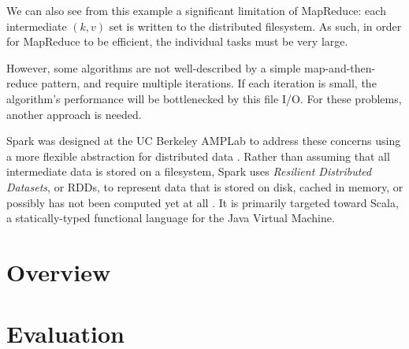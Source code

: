 \documentclass{article}
\begin{document}
We can also see from this example a significant limitation of MapReduce: each
intermediate $(k, v)$ set is written to the distributed filesystem.  As such,
in order for MapReduce to be efficient, the individual tasks must be very
large.

However, some algorithms are not well-described by a simple map-and-then-reduce
pattern, and require multiple iterations.  If each iteration is small, the
algorithm's performance will be bottlenecked by this file I/O. For these
problems, another approach is needed.

Spark was designed at the UC Berkeley AMPLab to address these concerns using a
more flexible abstraction for distributed data \citep{zaharia}. Rather than
assuming that all intermediate data is stored on a filesystem, Spark uses
\emph{Resilient Distributed Datasets}, or RDDs, to represent data that is
stored on disk, cached in memory, or possibly has not been computed yet at all
\citep{zaharia_rdd}.  It is primarily targeted toward Scala, a statically-typed
functional language for the Java Virtual Machine.

\section{Overview}

\section{Evaluation}


\end{document}
